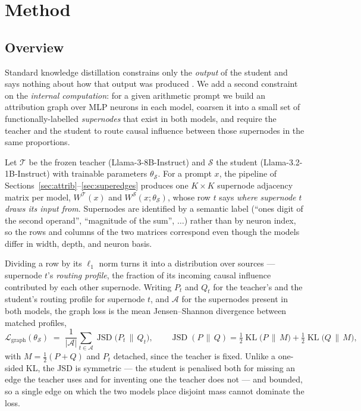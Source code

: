 \documentclass{article}
\DeclareMathOperator{\KL}{KL}
\DeclareMathOperator{\JSD}{JSD}
\newcommand{\Teach}{\mathcal{T}}
\newcommand{\Stud}{\mathcal{S}}
\begin{document}
\section{Method}

\subsection{Overview}
\label{sec:overview}

Standard knowledge distillation constrains only the \emph{output} of the student and says nothing
about how that output was produced \citep{hinton2015distilling}. We add a second constraint on the
\emph{internal computation}: for a given arithmetic prompt we build an attribution graph over MLP
neurons in each model, coarsen it into a small set of functionally-labelled \emph{supernodes} that
exist in both models, and require the teacher and the student to route causal influence between
those supernodes in the same proportions.

Let $\Teach$ be the frozen teacher (Llama-3-8B-Instruct) and $\Stud$ the student
(Llama-3.2-1B-Instruct) with
trainable parameters $\theta_\Stud$. For a prompt $x$, the pipeline of
Sections~\ref{sec:attrib}--\ref{sec:superedges} produces one $K \times K$ supernode adjacency
matrix per model, $W^{\Teach}(x)$ and $W^{\Stud}(x;\theta_\Stud)$, whose row $t$ says
\emph{where supernode $t$ draws its input from}. Supernodes are identified by a semantic label
(``ones digit of the second operand'', ``magnitude of the sum'', $\dots$) rather than by neuron
index, so the rows and columns of the two matrices correspond even though the models differ in
width, depth, and neuron basis.

Dividing a row by its $\ell_1$ norm turns it into a distribution over sources --- supernode $t$'s
\emph{routing profile}, the fraction of its incoming causal influence contributed by each other
supernode. Writing $P_t$ and $Q_t$ for the teacher's and the student's routing profile for
supernode $t$, and $\mathcal{A}$ for the supernodes present in both models, the graph loss is the
mean Jensen--Shannon divergence between matched profiles,
\begin{equation}
  \mathcal{L}_{\mathrm{graph}}(\theta_\Stud)
  \;=\;
  \frac{1}{|\mathcal{A}|}\sum_{t \in \mathcal{A}} \JSD\bigl(P_t \,\big\|\, Q_t\bigr),
  \qquad
  \JSD(P \,\|\, Q) = \tfrac12 \KL\bigl(P \,\big\|\, M\bigr) + \tfrac12 \KL\bigl(Q \,\big\|\, M\bigr),
  \label{eq:graphloss}
\end{equation}
with $M = \tfrac12(P + Q)$ and $P_t$ detached, since the teacher is fixed. Unlike a one-sided KL,
the JSD is symmetric --- the student is penalised both for missing an edge the teacher uses and for
inventing one the teacher does not --- and bounded, so a single edge on which the two models place
disjoint mass cannot dominate the loss.
\end{document}
